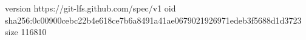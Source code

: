 version https://git-lfs.github.com/spec/v1
oid sha256:0c00900cebc22b4e618ce7b6a8491a41ae0679021926971edeb3f5688d1d3723
size 116810
